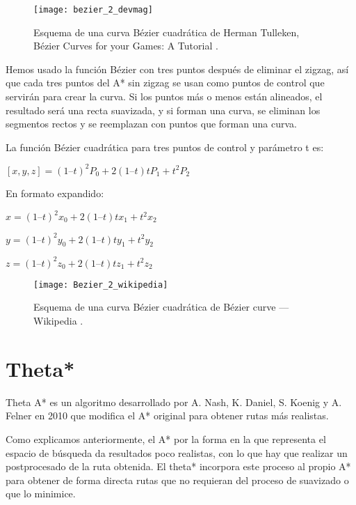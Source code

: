 \begin{figure}[htpb]
    \centering
    \texttt{[image: bezier\_2\_devmag]}
    \caption[Esquema de una curva Bézier cuadrática de Herman Tulleken]{Esquema de una curva Bézier cuadrática de Herman Tulleken, Bézier Curves for your Games: A Tutorial \cite{bezierdevmag_imagen}.}
    \label{fig:basics AFM sketch}
\end{figure}

Hemos usado la función Bézier con tres puntos después de eliminar el zigzag, así que cada tres puntos del A* sin zigzag se usan como puntos de control que servirán para crear la curva. Si los puntos más o menos están alineados, el resultado será una recta suavizada, y si forman una curva, se eliminan los segmentos rectos y se reemplazan con puntos que forman una curva.

\newpage 

La función Bézier cuadrática para tres puntos de control y parámetro t es:

\begin{center}
$[x, y, z] = (1 – t)^2P_0 + 2(1 – t)tP_1 + t^2P_2$
\end{center}

En formato expandido:
\begin{center}
$x = (1 – t)^2x_0 + 2(1 – t)tx_1 + t^2x_2$

$y = (1 – t)^2y_0 + 2(1 – t)ty_1 + t^2y_2$

$z = (1 – t)^2z_0 + 2(1 – t)tz_1 + t^2z_2$
\end{center}

\begin{figure}[htpb]
    \centering
    \texttt{[image: Bezier\_2\_wikipedia]}
    \caption[Esquema de una curva Bézier cuadrática, Wikipedia]{Esquema de una curva Bézier cuadrática de Bézier curve --- Wikipedia \cite{wiki:bezierimagen}.}
    \label{fig:basics AFM sketch}
\end{figure}

\section{Theta*} \label{referenciaTheta}
Theta A* es un algoritmo desarrollado por A. Nash, K. Daniel, S. Koenig y A. Felner \cite{thetaestrella, thetaestrellaweb} en 2010 que modifica el A* original para obtener rutas más realistas.

Como explicamos anteriormente, el A* por la forma en la que representa el espacio de búsqueda da resultados poco realistas, con lo que hay que realizar un postprocesado de la ruta obtenida. El theta* incorpora este proceso al propio A* para obtener de forma directa rutas que no requieran del proceso de suavizado o que lo minimice.

